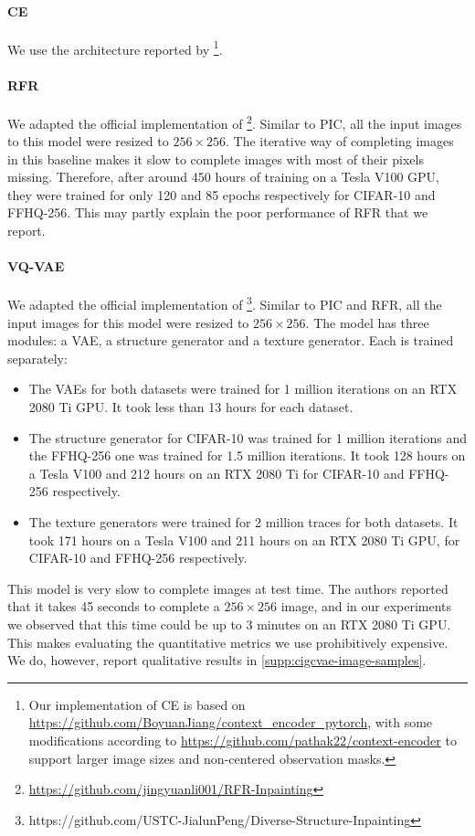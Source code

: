 \paragraph{CE} We use the architecture reported by
\citet{pathak2016context}\footnote{Our implementation of CE is based on
  \url{https://github.com/BoyuanJiang/context_encoder_pytorch}, with some
  modifications according to \url{https://github.com/pathak22/context-encoder}
  to support larger image sizes and non-centered observation masks.}.

\paragraph{RFR} We adapted the official implementation of
\citet{li2020recurrent}\footnote{\url{https://github.com/jingyuanli001/RFR-Inpainting}}.
Similar to PIC, all the input images to this model were resized to
$256 \times 256$. The iterative way of completing images in this baseline makes
it slow to complete images with most of their pixels missing. Therefore, after
around 450 hours of training on a Tesla V100 GPU, they were trained for only 120
and 85 epochs respectively for CIFAR-10 and FFHQ-256. This may partly explain
the poor performance of RFR that we report.

\paragraph{VQ-VAE} We adapted the official implementation of
\citet{peng2021generating}\footnote{https://github.com/USTC-JialunPeng/Diverse-Structure-Inpainting}.
Similar to PIC and RFR, all the input images for this model were resized to
$256 \times 256$. The model has three modules: a VAE, a structure generator and
a texture generator. Each is trained separately:
\begin{itemize}
\item The VAEs for both datasets were trained for 1 million iterations on an RTX
  2080 Ti GPU. It took less than 13 hours for each dataset.
  \item The structure generator for CIFAR-10 was trained for 1 million
        iterations and the FFHQ-256 one was trained for 1.5 million iterations.
        It took 128 hours on a Tesla V100 and 212 hours on an RTX 2080 Ti for
        CIFAR-10 and FFHQ-256 respectively.
  \item The texture generators were trained for 2 million traces for both
        datasets. It took 171 hours on a Tesla V100 and 211 hours on an RTX 2080
        Ti GPU, for CIFAR-10 and FFHQ-256 respectively.
\end{itemize}
This model is very slow to complete images at test time. The authors reported
that it takes 45 seconds to complete a $256 \times 256$ image, and in our
experiments we observed that this time could be up to 3 minutes on an RTX 2080
Ti GPU. This makes evaluating the quantitative metrics we use prohibitively
expensive. We do, however, report qualitative results in
\cref{supp:cigcvae-image-samples}.


